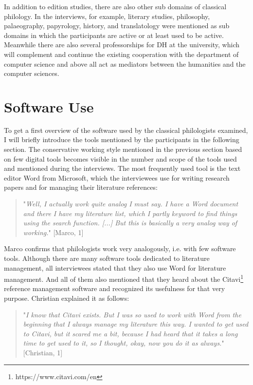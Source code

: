 \documentclass[12pt, a4paper, titlepage, oneside, abstract=true, toc=listof, toc=bibliography, BCOR=1cm]{scrreprt}
\begin{document}
In addition to edition studies, there are also other sub domains of classical philology. In the interviews, for example, literary studies, philosophy, palaeography, papyrology, history, and translatology were mentioned as sub domains in which the participants are active or at least used to be active. Meanwhile there are also several professorships for \gls{DH} at the university, which will complement and continue the existing cooperation with the department of computer science and above all act as mediators between the humanities and the computer sciences. 

\section{Software Use}
\label{sec:SW_use}
To get a first overview of the software used by the classical philologists examined, I will briefly introduce the tools mentioned by the participants in the following section.
The conservative working style mentioned in the previous section based on few digital tools becomes visible in the number and scope of the tools used and mentioned during the interviews. The most frequently used tool is the text editor \gls{Word} from Microsoft, which the interviewees use for writing research papers and for managing their literature references:

\begin{quotation}
"\textit{Well, I actually work quite analog I must say. I have a Word document and there I have my literature list, which I partly keyword to find things using the search function. [...] But this is basically a very analog way of working.}" [Marco, 1]
\end{quotation}

Marco confirms that philologists work very analogously, i.e. with few software tools. Although there are many software tools dedicated to literature management, all interviewees stated that they also use Word for literature management. And all of them also mentioned that they heard about the \gls{Citavi}\footnote{https://www.citavi.com/en} reference management software and recognized its usefulness for that very purpose. Christian explained it as follows:

\begin{quotation}
"\textit{I know that Citavi exists. But I was so used to work with Word from the beginning that I always manage my literature this way. I wanted to get used to Citavi, but it scared me a bit, because I had heard that it takes a long time to get used to it, so I thought, okay, now you do it as always.}" [Christian, 1]
\end{quotation}
 
\end{document}
